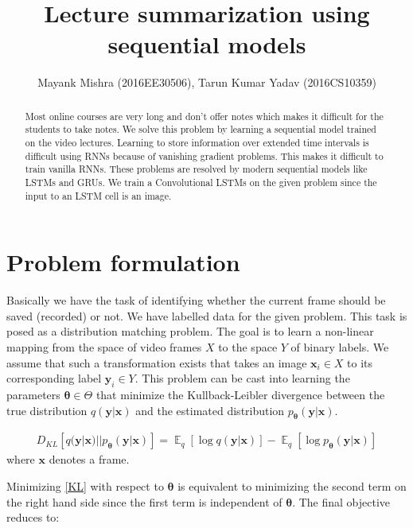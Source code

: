 \documentclass[journal]{IEEEtran}
\newcommand{\bx}{\bm{x}}
\newcommand{\by}{\bm{y}}
\newcommand{\btheta}{\bm{\theta}}
\DeclareMathOperator{\expectation}{\mathbb{E}}
\begin{document}
\title{Lecture summarization using sequential models}

\author{Mayank Mishra (2016EE30506), Tarun Kumar Yadav (2016CS10359)}

\maketitle

\begin{abstract}
Most online courses are very long and don't offer notes which makes it difficult for the students to take notes. We solve this problem by learning a sequential model trained on the video lectures. Learning to store information over extended time intervals is difficult using RNNs because of vanishing gradient problems. This makes it difficult to train vanilla RNNs. These problems are resolved by modern sequential models like LSTMs and GRUs. We train a Convolutional LSTMs on the given problem since the input to an LSTM cell is an image.

\end{abstract}

\section{Problem formulation}
Basically we have the task of identifying whether the current frame should be saved (recorded) or not. We have labelled data for the given problem. This task is posed as a distribution matching problem. The goal is to learn a non-linear mapping from the space of video frames $X$ to the space $Y$ of binary labels. We assume that such a transformation exists that takes an image $\bx_i \in X$ to its corresponding label $\by_i \in Y$. This problem can be cast into learning the parameters $\btheta \in \Theta$ that minimize the Kullback-Leibler divergence between the true distribution $q (\by | \bx)$ and the estimated distribution $p_{\btheta} (\by | \bx)$.

\begin{equation}
	\label{KL}
	\begin{aligned}
		D_{KL} \left[ q (\by | \bx) || p_{\btheta} (\by | \bx) \right] = \expectation_q [\log q (\by | \bx)] - \expectation_q [\log p_{\btheta} (\by | \bx)]
	\end{aligned}
\end{equation}
where $\bx$ denotes a frame.

Minimizing \eqref{KL} with respect to $\btheta$ is equivalent to minimizing the second term on the right hand side since the first term is independent of $\btheta$. The final objective reduces to:
\end{document}
